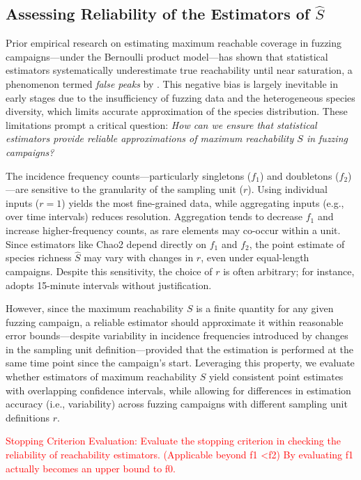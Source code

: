 \subsection{Assessing Reliability of the Estimators of \texorpdfstring{$\hat{S}$}{S-hat}}

Prior empirical research on estimating maximum reachable coverage in fuzzing campaigns—under the Bernoulli product model—has shown that statistical estimators systematically underestimate true reachability until near saturation, a phenomenon termed \emph{false peaks} by \cite{reachability_2023}. This negative bias is largely inevitable in early stages due to the insufficiency of fuzzing data and the heterogeneous species diversity, which limits accurate approximation of the species distribution. These limitations prompt a critical question: \emph{How can we ensure that statistical estimators provide reliable approximations of maximum reachability $S$ in fuzzing campaigns?}


The incidence frequency counts—particularly singletons ($f_1$) and doubletons ($f_2$)—are sensitive to the granularity of the sampling unit ($r$). Using individual inputs ($r=1$) yields the most fine-grained data, while aggregating inputs (e.g., over time intervals) reduces resolution. Aggregation tends to decrease $f_1$ and increase higher-frequency counts, as rare elements may co-occur within a unit. Since estimators like Chao2 depend directly on $f_1$ and $f_2$, the point estimate of species richness $\hat{S}$ may vary with changes in $r$, even under equal-length campaigns. Despite this sensitivity, the choice of $r$ is often arbitrary; for instance, \cite{reachability_2023} adopts 15-minute intervals without justification.

However, since the maximum reachability $S$ is a finite quantity for any given fuzzing campaign, a reliable estimator should approximate it within reasonable error bounds—despite variability in incidence frequencies introduced by changes in the sampling unit definition—provided that the estimation is performed at the same time point since the campaign's start. Leveraging this property, we evaluate whether estimators of maximum reachability $S$ yield consistent point estimates with overlapping confidence intervals, while allowing for differences in estimation accuracy (i.e., variability) across fuzzing campaigns with different sampling unit definitions $r$.

\textcolor{red}{Stopping Criterion Evaluation:
Evaluate the stopping criterion in checking the reliability of reachability estimators. (Applicable beyond f1 <f2) By evaluating f1 actually becomes an upper bound to f0.
}
